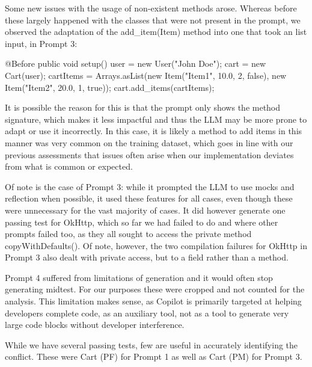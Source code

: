 Some new issues with the usage of non-existent methods arose. Whereas before these largely happened with the classes that were not present
in the prompt, we observed the adaptation of the add\_item(Item) method into one that took an list input, in Prompt 3:
\begin{response}
    @Before
    public void setup() {
        user = new User("John Doe");
        cart = new Cart(user);
        cartItems = Arrays.asList(new Item("Item1", 10.0, 2, false),
                                  new Item("Item2", 20.0, 1, true));
        cart.add_items(cartItems);
    }
\end{response}
It is possible the reason for this is that the prompt only shows the method signature, which makes it less impactful and thus the LLM may be
more prone to adapt or use it incorrectly. In this case, it is likely a method to add items in this manner was very common on the training dataset,
which goes in line with our previous assessments that issues often arise when our implementation deviates from what is common or expected.

Of note is the case of Prompt 3: while it prompted the LLM to use mocks and reflection when possible, it used these features
for all cases, even though these were unnecessary for the vast majority of cases. It did however generate one passing test for OkHttp,
which so far we had failed to do and where other prompts failed too, as they all sought to access the private method copyWithDefaults().
Of note, however, the two compilation failures for OkHttp in Prompt 3 also dealt with private access, but to a field rather than a method.

Prompt 4 suffered from limitations of generation and it would often stop generating midtest. For our purposes these were cropped and not counted for the analysis.
This limitation makes sense, as Copilot is primarily targeted at helping developers complete code, as an auxiliary tool, not as a tool to generate very large
code blocks without developer interference.

While we have several passing tests, few are useful in accurately identifying the conflict.
These were Cart (PF) for Prompt 1 as well as Cart (PM) for Prompt 3.


